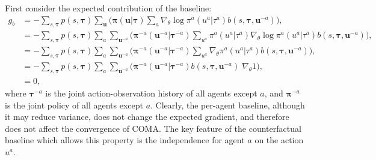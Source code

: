 \documentclass[letterpaper]{article}
\newcommand{\myvec}[1]{\mathbf{#1}}
\newcommand{\myvecsym}[1]{\boldsymbol{#1}}
\newcommand{\vpi}{\myvecsym{\pi}}
\newcommand{\vtau}{\myvecsym{\tau}}
\newcommand{\vu}{\myvec{u}}
\begin{document}
First consider the expected contribution of the baseline:
\begin{align}
g_b &= - \sum_{s, \vtau} p(s, \vtau) \sum_{\vu} \bigg( \vpi(\vu | \vtau) \sum_a \nabla_\theta \log \pi^a(u^a | \tau^a)
b(s, \vtau, \vu^{-a}) \bigg), \\
 &= - \sum_{s, \vtau} p(s, \vtau) \sum_a \sum_{\vu^{-a}} \bigg( 
\vpi^{-a}(\vu^{-a}|\vtau^{-a}) \sum_{u^a} 
\pi^a(u^a|\tau^a)  \nabla_\theta \log \pi^a(u^a | \tau^a)
b(s, \vtau, \vu^{-a}) \bigg), \\
&= - \sum_{s, \vtau} p(s,\vtau) \sum_a \sum_{\vu^{-a}} \bigg( \vpi^{-a}(\vu^{-a}|\vtau^{-a}) 
\sum_{u^a} 
\nabla_\theta \pi^a(u^a | \tau^a)
b(s, \vtau, \vu^{-a}) \bigg), \\
&= - \sum_{s, \vtau} p(s, \vtau) \sum_a \sum_{\vu^{-a}} \bigg( \vpi^{-a}(\vu^{-a}|\vtau^{-a})
b(s, \vtau, \vu^{-a}) \; \nabla_\theta 1 \bigg), \\
&= 0,
\end{align}
where $\vtau^{-a}$ is the joint action-observation history of all agents except $a$, and $\vpi^{-a}$ is the joint policy of all agents except $a$.
Clearly, the per-agent baseline, although it may reduce variance, does not change 
the expected gradient, and therefore does not affect the convergence of COMA. 
The key feature of the counterfactual baseline which allows this property is the independence for agent $a$ on the action $u^a$.
\end{document}
